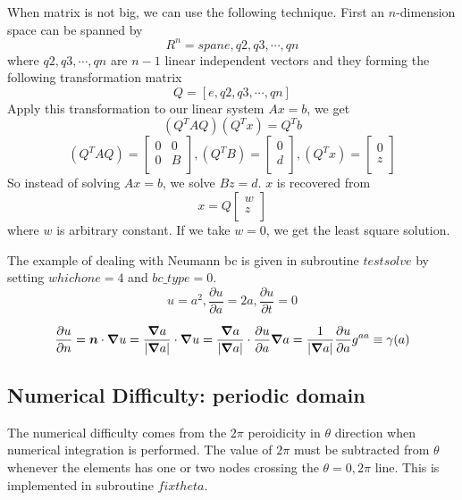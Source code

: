 \documentclass{report}
\newcommand{\bm}[1]{\mbox{\boldmath $#1$}}
\newcommand{\ff}[2]{\frac{#1}{#2}}
\newcommand{\pp}[2]{\frac{\partial{#1}}{\partial{#2}}}
\begin{document}
When matrix is not big, we can use the following technique. First an
$n$-dimension space can be spanned by
$$
R^n=span{e,q2,q3,\cdots,qn}
$$
where $q2, q3, \cdots, qn$ are $n-1$ linear independent vectors and 
they forming the following transformation matrix
$$
Q=\left[ e,q2,q3,\cdots,qn \right]
$$
Apply this transformation to our linear system $Ax=b$, we get
$$(Q^T A Q) (Q^T x) = Q^T b
$$
$$
(Q^T A Q) = \left[ \begin{array}{ll}  
                         0 & 0 \\
                         0 & B \\
                   \end{array}  
            \right],
(Q^T B) = \left[ \begin{array}{l}  
                         0 \\
                         d \\
                   \end{array}  
            \right],
(Q^T x) = \left[ \begin{array}{l}  
                         0 \\
                         z \\
                   \end{array}  
            \right]
$$
So instead of solving $Ax=b$, we solve $Bz=d$. $x$ is recovered from
$$
x = Q \left[ \begin{array}{l}  
                         w \\
                         z \\
                   \end{array}  
            \right]
$$
where $w$ is arbitrary constant.
If we take $w=0$, we get the least square solution.

The example of dealing with Neumann bc is given in subroutine $testsolve$
by setting $whichone=4$ and $bc\_type=0$.
$$
u=a^2, \pp{u}{a}=2a, \pp{u}{t}=0
$$

$$
\pp{u}{n}
=\bm{n} \cdot \bm{\nabla} u
=\ff{\bm{\nabla}a}{|\bm{\nabla}a|} \cdot \bm{\nabla} u
=\ff{\bm{\nabla}a}{|\bm{\nabla}a|} \cdot \pp{u}{a} \bm{\nabla}a
=\ff{1}{|\bm{\nabla}a|} \pp{u}{a} g^{aa}
\equiv \gamma(a)
$$



\subsection{Numerical Difficulty: periodic domain}
\label{sec:period}
The numerical difficulty comes from the $2\pi$ peroidicity in $\theta$ direction
when numerical integration is performed.
The value of $2\pi$ must be subtracted from $\theta$ 
whenever the elements has one or two nodes crossing the $\theta=0, 2\pi$ line.
This is implemented in subroutine $fixtheta$.
\end{document}
